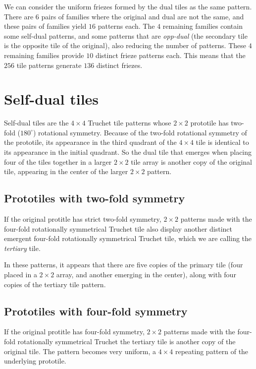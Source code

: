 \documentclass{tufte-book}
\begin{document}
\vspace{0.5cm}
\noindent
We can consider the uniform friezes formed by the dual tiles as the same pattern. There are $6$ pairs of families where the original and dual are not the same, and these pairs of families yield $16$ patterns each. The $4$ remaining families contain some self-dual patterns, and some patterns that are \textit{opp-dual} (the secondary tile is the opposite tile of the original), also reducing the number of patterns. These $4$ remaining families provide $10$ distinct frieze patterns each. This means that the $256$ tile patterns generate $136$ distinct friezes. 

\vspace{0.5cm}
\noindent

\noindent
\newpage



\chapter{Self-dual tiles}

\noindent
Self-dual tiles are the $4\times 4$ Truchet tile patterns whose $2\times 2$ prototile has two-fold ($180^{\circ}$) rotational symmetry. Because of the two-fold rotational symmetry of the prototile, its appearance in the third quadrant of the $4\times 4$ tile is identical to its appearance in the initial quadrant. So the dual tile that emerges when placing four of the tiles together in a larger $2\times 2$ tile array is another copy of the original tile, appearing in the center of the  larger $2\times 2$ pattern. 

\setlength{\tabcolsep}{0pt}
\renewcommand{\arraystretch}{0}
\section{Prototiles with two-fold symmetry}

If the original protitle has strict two-fold symmetry,  $2\times 2$ patterns made with the four-fold rotationally symmetrical Truchet tile also display another distinct emergent four-fold rotationally symmetrical Truchet tile, which we are calling the \textit{tertiary} tile. 

\noindent
In these patterns, it appears that there are five copies of the primary tile (four placed in a $2\times 2$ array, and another emerging in the center), along with four copies of the tertiary tile pattern.


\section{Prototiles with four-fold symmetry}

\noindent
If the original protitle has four-fold symmetry,  $2\times 2$ patterns made with the four-fold rotationally symmetrical Truchet the tertiary tile is another copy of the original tile. The pattern becomes very uniform, a $4\times4$ repeating pattern of the underlying prototile.


\end{document}
